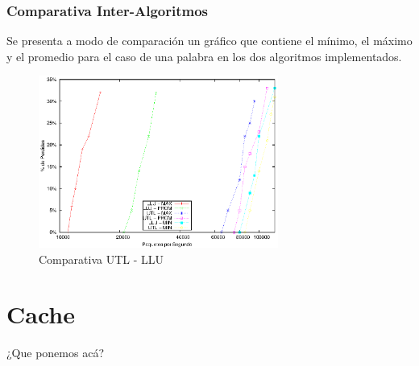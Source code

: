 \newpage
\subsubsection{Comparativa Inter-Algoritmos}
Se presenta a modo de comparación un gráfico que contiene el mínimo, el máximo y el promedio para el caso de una palabra en los dos algoritmos implementados. 
\begin{figure}[!h]
  \centering
	\includegraphics[width=0.7\textwidth]{5-resultados/graf/lluvsutl.eps}
  \caption{Comparativa UTL - LLU}
  \label{figvs}
\end{figure}


\newpage
\section{Cache}
 
¿Que ponemos acá?

